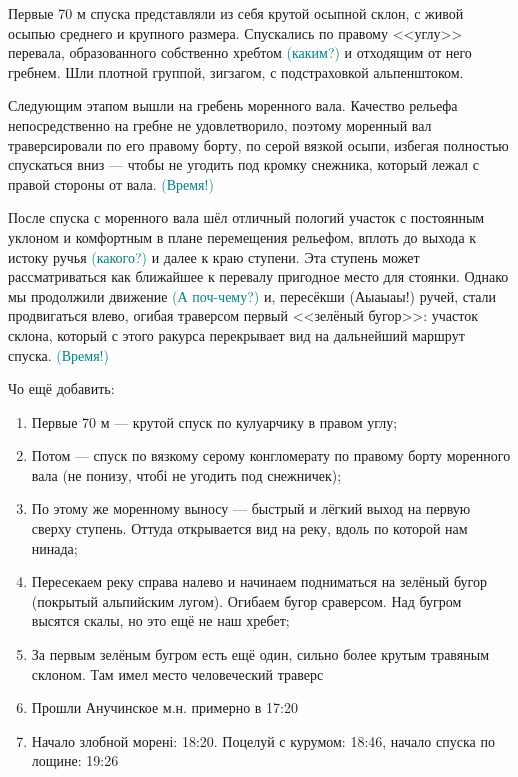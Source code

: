 Первые 70 м спуска представляли из себя крутой осыпной склон, с живой осыпью среднего и крупного размера. Спускались по правому <<углу>> перевала, образованного собственно хребтом \textcolor{teal}{(каким?)} и отходящим от него гребнем. Шли плотной группой, зигзагом, с подстраховкой альпенштоком.  

Следующим этапом вышли на гребень моренного вала. Качество рельефа непосредственно на гребне не удовлетворило, поэтому моренный вал траверсировали по его правому борту, по серой вязкой осыпи, избегая полностью спускаться вниз --- чтобы не угодить под кромку снежника, который лежал с правой стороны от вала. \textcolor{teal}{(Время!)} 

После спуска с моренного вала шёл отличный пологий участок с постоянным уклоном и комфортным в плане перемещения рельефом, вплоть до выхода к истоку ручья \textcolor{teal}{(какого?)} и далее к краю  ступени. Эта ступень может рассматриваться как ближайшее к перевалу пригодное место для стоянки. Однако мы продолжили движение \textcolor{teal}{(А поч-чему?)} и, пересёкши \textcolor{textcolor}{(Аыаыаы!)} ручей, стали продвигаться влево, огибая траверсом первый <<зелёный бугор>>: участок склона, который с этого ракурса перекрывает вид на дальнейший маршрут спуска. \textcolor{teal}{(Время!)} 



Чо ещё добавить: 
\begin{enumerate} 
	\item Первые 70 м — крутой спуск по кулуарчику в правом углу; 
	\item Потом — спуск по вязкому серому конгломерату по правому борту моренного вала (не понизу, чтобі не угодить под снежничек); 
	\item По этому же моренному выносу — быстрый и лёгкий выход на первую сверху ступень. Оттуда открывается вид на реку, вдоль по которой нам нинада; 
	\item Пересекаем реку справа налево и начинаем подниматься на зелёный бугор (покрытый альпийским лугом). Огибаем бугор сраверсом. Над бугром высятся скалы, но это ещё не наш хребет; 
	\item  За первым зелёным бугром есть ещё один, сильно более крутым травяным склоном. Там имел место человеческий траверс\texttrademark
	\item Прошли Анучинское м.н. примерно в 17:20
	\item Начало злобной морені: 18:20. Поцелуй с курумом: 18:46, начало спуска по лощине: 19:26
\end{enumerate}


\clearpage